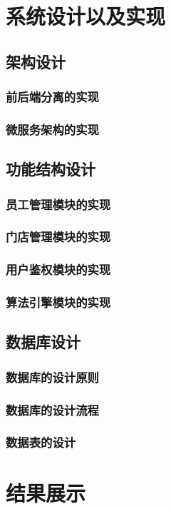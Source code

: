 \documentclass{ctexart}
\begin{document}
\section{系统设计以及实现}
\subsection{架构设计}
\subsubsection{前后端分离的实现}
\subsubsection{微服务架构的实现}
\subsection{功能结构设计}
\subsubsection{员工管理模块的实现}
\subsubsection{门店管理模块的实现}
\subsubsection{用户鉴权模块的实现}
\subsubsection{算法引擎模块的实现}
\subsection{数据库设计}
\subsubsection{数据库的设计原则}
\subsubsection{数据库的设计流程}
\subsubsection{数据表的设计}


\section{结果展示}
\end{document}
